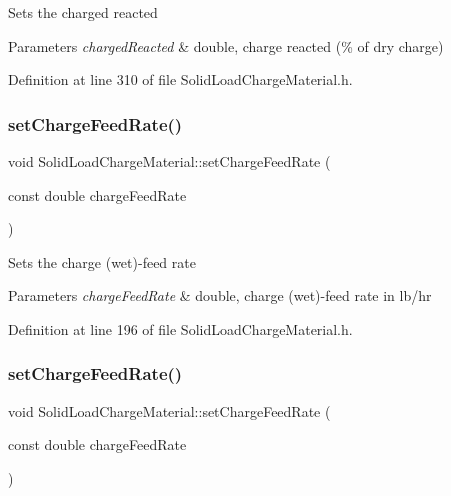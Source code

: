 Sets the charged reacted 
\begin{DoxyParams}{Parameters}
{\em charged\+Reacted} & double, charge reacted (\% of dry charge) \\
\hline
\end{DoxyParams}


Definition at line 310 of file Solid\+Load\+Charge\+Material.\+h.

\mbox{\label{class_solid_load_charge_material_adc50117256b714789f68097437ca658d}} 
\subsubsection{\texorpdfstring{set\+Charge\+Feed\+Rate()}{setChargeFeedRate()}\hspace{0.1cm}{\footnotesize\ttfamily [1/3]}}
{\footnotesize\ttfamily void Solid\+Load\+Charge\+Material\+::set\+Charge\+Feed\+Rate (\begin{DoxyParamCaption}\item[{const double}]{charge\+Feed\+Rate }\end{DoxyParamCaption})\hspace{0.3cm}{\ttfamily [inline]}}

Sets the charge (wet)-\/feed rate 
\begin{DoxyParams}{Parameters}
{\em charge\+Feed\+Rate} & double, charge (wet)-\/feed rate in lb/hr \\
\hline
\end{DoxyParams}


Definition at line 196 of file Solid\+Load\+Charge\+Material.\+h.

\mbox{\label{class_solid_load_charge_material_adc50117256b714789f68097437ca658d}} 
\subsubsection{\texorpdfstring{set\+Charge\+Feed\+Rate()}{setChargeFeedRate()}\hspace{0.1cm}{\footnotesize\ttfamily [2/3]}}
{\footnotesize\ttfamily void Solid\+Load\+Charge\+Material\+::set\+Charge\+Feed\+Rate (\begin{DoxyParamCaption}\item[{const double}]{charge\+Feed\+Rate }\end{DoxyParamCaption})\hspace{0.3cm}{\ttfamily [inline]}}

